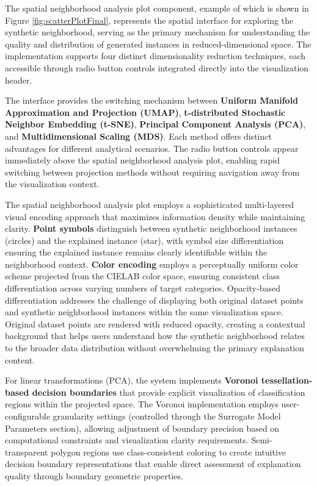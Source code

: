 The spatial neighborhood analysis plot component, example of which is shown in Figure \ref{fig:scatterPlotFinal}, represents the spatial interface for exploring the synthetic neighborhood, serving as the primary mechanism for understanding the quality and distribution of generated instances in reduced-dimensional space. The implementation supports four distinct dimensionality reduction techniques, each accessible through radio button controls integrated directly into the visualization header.

The interface provides the switching mechanism between \textbf{Uniform Manifold Approximation and Projection (UMAP)}, \textbf{t-distributed Stochastic Neighbor Embedding (t-SNE)}, \textbf{Principal Component Analysis (PCA)}, and \textbf{Multidimensional Scaling (MDS)}. Each method offers distinct advantages for different analytical scenarios.
The radio button controls appear immediately above the spatial neighborhood analysis plot, enabling rapid switching between projection methods without requiring navigation away from the visualization context. 

The spatial neighborhood analysis plot employs a sophisticated multi-layered visual encoding approach that maximizes information density while maintaining clarity. \textbf{Point symbols} distinguish between synthetic neighborhood instances (circles) and the explained instance (star), with symbol size differentiation ensuring the explained instance remains clearly identifiable within the neighborhood context. \textbf{Color encoding} employs a perceptually uniform color scheme projected from the CIELAB color space, ensuring consistent class differentiation across varying numbers of target categories.
%
Opacity-based differentiation addresses the challenge of displaying both original dataset points and synthetic neighborhood instances within the same visualization space. Original dataset points are rendered with reduced opacity, creating a contextual background that helps users understand how the synthetic neighborhood relates to the broader data distribution without overwhelming the primary explanation content.

For linear transformations (PCA), the system implements \textbf{Voronoi tessellation-based decision boundaries} that provide explicit visualization of classification regions within the projected space. The Voronoi implementation employs user-configurable granularity settings (controlled through the Surrogate Model Parameters section), allowing adjustment of boundary precision based on computational constraints and visualization clarity requirements. Semi-transparent polygon regions use class-consistent coloring to create intuitive decision boundary representations that enable direct assessment of explanation quality through boundary geometric properties.

